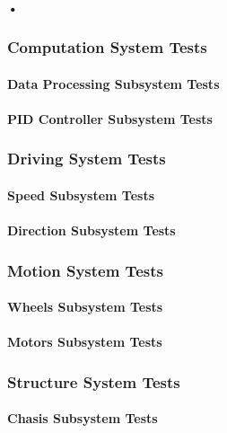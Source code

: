 \documentclass[a4paper,12pt]{article}
\begin{document}
		\paragraph{•}
	\subsubsection{Computation System Tests}
	
	\paragraph{Data Processing Subsystem Tests}	
		
	\paragraph{PID Controller Subsystem Tests}
	
	
	\subsubsection{Driving System Tests}
	
	\paragraph{Speed Subsystem Tests}	
		
	\paragraph{Direction Subsystem Tests}


	\subsubsection{Motion System Tests}
	
	\paragraph{Wheels Subsystem Tests}	
		
	\paragraph{Motors Subsystem Tests}
	
	
	\subsubsection{Structure System Tests}
	
	\paragraph{Chasis Subsystem Tests}	
		
\end{document}
